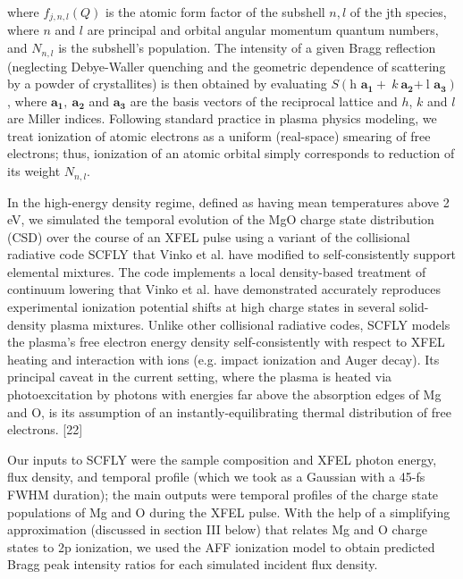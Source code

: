 where \(f_{j,n,l}\left( Q \right)\) is the atomic form factor of the
subshell \(n,l\) of the jth species, where \(n\) and \(l\) are principal
and orbital angular momentum quantum numbers, and \(N_{n,l}\) is the
subshell's population. The intensity of a given Bragg reflection
(neglecting Debye-Waller quenching and the geometric dependence of
scattering by a powder of crystallites) is then obtained by evaluating
\(S\left( \text{h\ }\mathbf{a}_{\mathbf{1}} + \ k\ \mathbf{a}_{\mathbf{2}}\mathbf{+ \ }\text{l\ }\mathbf{a}_{\mathbf{3}} \right)\),
where \(\mathbf{a}_{\mathbf{1}}\mathbf{,\ }\mathbf{a}_{\mathbf{2}}\) and
\(\mathbf{a}_{\mathbf{3}}\) are the basis vectors of the reciprocal
lattice and \(h\), \(k\) and \(l\) are Miller indices. Following
standard practice in plasma physics modeling, we treat ionization of
atomic electrons as a uniform (real-space) smearing of free electrons;
thus, ionization of an atomic orbital simply corresponds to reduction of
its weight \(N_{n,l}\).

In the high-energy density regime, defined as having mean temperatures
above 2 eV, we simulated the temporal evolution of the MgO charge state
distribution (CSD) over the course of an XFEL pulse using a variant of
the collisional radiative code SCFLY that Vinko et al. have modified to
self-consistently support elemental mixtures. \cite{ciricosta2016measurements} The code
implements a local density-based treatment of continuum lowering that
Vinko et al. have demonstrated accurately reproduces experimental
ionization potential shifts at high charge states in several
solid-density plasma mixtures. Unlike other collisional radiative codes,
SCFLY models the plasma's free electron energy density self-consistently
with respect to XFEL heating and interaction with ions (e.g. impact
ionization and Auger decay). Its principal caveat in the current
setting, where the plasma is heated via photoexcitation by photons with
energies far above the absorption edges of Mg and O, is its assumption
of an instantly-equilibrating thermal distribution of free electrons.
{[}22{]}

Our inputs to SCFLY were the sample composition and XFEL photon energy,
flux density, and temporal profile (which we took as a Gaussian with a
45-fs FWHM duration); the main outputs were temporal profiles of the
charge state populations of Mg and O during the XFEL pulse. With the
help of a simplifying approximation (discussed in section III below)
that relates Mg and O charge states to 2p ionization, we used the AFF
ionization model to obtain predicted Bragg peak intensity ratios for
each simulated incident flux density.

